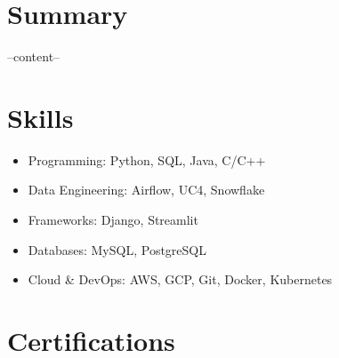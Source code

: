 


\section*{Summary}
--content--
\section*{Skills}
\begin{itemize}
    \item Programming: Python, SQL, Java, C/C++
    \item Data Engineering: Airflow, UC4, Snowflake
    \item Frameworks: Django, Streamlit
    \item Databases: MySQL, PostgreSQL
    \item Cloud \& DevOps: AWS, GCP, Git, Docker, Kubernetes
\end{itemize}

\section*{Certifications}
   

